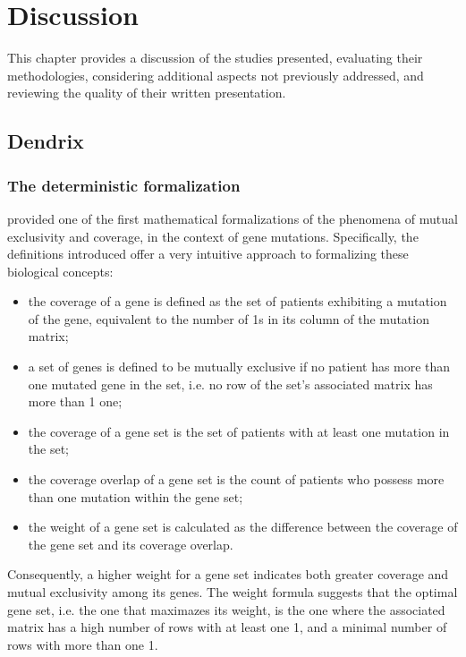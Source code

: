 \chapter{Discussion} \label{chap:discussion}

This chapter provides a discussion of the studies presented, evaluating their methodologies, considering additional aspects not previously addressed, and reviewing the quality of their written presentation.

\section{Dendrix}

\subsection{The deterministic formalization}

\textcite{dendrix} provided one of the first mathematical formalizations of the phenomena of mutual exclusivity and coverage, in the context of gene mutations. Specifically, the definitions introduced offer a very intuitive approach to formalizing these biological concepts:

\begin{itemize}
    \item the coverage of a gene is defined as the set of patients exhibiting a mutation of the gene, equivalent to the number of 1s in its column of the mutation matrix;
    \item a set of genes is defined to be mutually exclusive if no patient has more than one mutated gene in the set, i.e. no row of the set's associated matrix has more than 1 one;
    \item the coverage of a gene set is the set of patients with at least one mutation in the set;
    \item the coverage overlap of a gene set is the count of patients who possess more than one mutation within the gene set;
    \item the weight of a gene set is calculated as the difference between the coverage of the gene set and its coverage overlap.
\end{itemize}

Consequently, a higher weight for a gene set indicates both greater coverage and mutual exclusivity among its genes. The weight formula suggests that the optimal gene set, i.e. the one that maximazes its weight, is the one where the associated matrix has a high number of rows with at least one 1, and a minimal number of rows with more than one 1.

